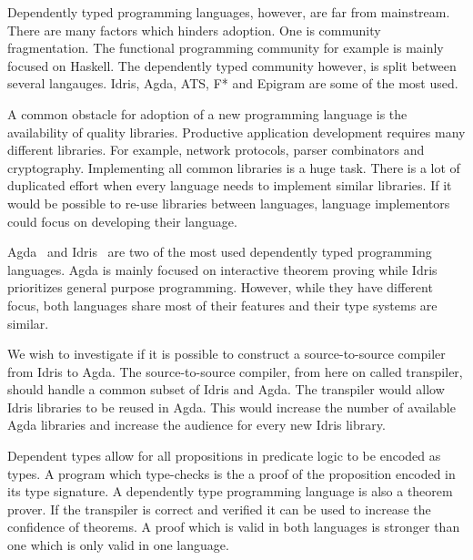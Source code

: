 \documentclass[parskip=half]{scrartcl}
\begin{document}
Dependently typed programming languages, however, are far from mainstream.
There are many factors which hinders adoption. One is community fragmentation.
The functional programming community for example is mainly focused on Haskell.
The dependently typed community however, is split between several langauges.
Idris, Agda, ATS, F* and Epigram are some of the most used.

A common obstacle for adoption of a new programming language is the
availability of quality libraries. Productive application development requires
many different libraries.  For example, network protocols, parser combinators
and cryptography.  Implementing all common libraries is a huge task.  There is
a lot of duplicated effort when every language needs to implement similar
libraries.  If it would be possible to re-use libraries between languages,
language implementors could focus on developing their language.

Agda~\cite{agda} and Idris~\cite{idris} are two of the most used dependently
typed programming languages.  Agda is mainly focused on interactive theorem
proving while Idris prioritizes general purpose programming.  However, while
they have different focus, both languages share most of their features and
their type systems are similar.

We wish to investigate if it is possible to construct a source-to-source
compiler from Idris to Agda. The source-to-source compiler, from here on called
transpiler, should handle a common subset of Idris and Agda.  The transpiler
would allow Idris libraries to be reused in Agda. This would increase the
number of available Agda libraries and increase the audience for every new
Idris library.

Dependent types allow for all propositions in predicate logic to be encoded as
types. A program which type-checks is the a proof of the proposition encoded in
its type signature. A dependently type programming language is also a theorem
prover. If the transpiler is correct and verified it can be used to increase
the confidence of theorems. A proof which is valid in both languages is
stronger than one which is only valid in one language.
\end{document}
